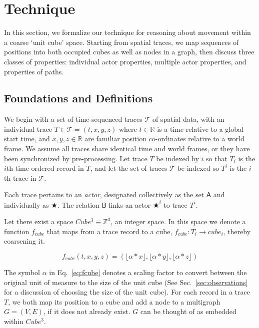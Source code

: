\section{Technique}
\label{sec:technique}

In this section, we formalize our technique for reasoning about movement within a coarse `unit cube' space.
Starting from spatial traces, we map sequences of positions into both occupied cubes as well as nodes in a graph, then discuss three classes of properties: individual actor properties, multiple actor properties, and properties of paths.

\subsection{Foundations and Definitions}
We begin with a set of time-sequenced traces $\mathcal{T}$ of spatial data, with an individual trace $T\in\mathcal{T} = (t,x,y,z)$ where $t\in\mathbb{R}$ is a time relative to a global start time, and $x,y,z\in \mathbb{R}$ are familiar position co-ordinates relative to a world frame. 
We assume all traces share identical time and world frames, or they have been synchronized by pre-processing.
Let trace $T$ be indexed by $i$ so that $T_i$ is the $i$th time-ordered record in $T$, and let the set of traces $\mathcal{T}$ be indexed so $T^i$ is the $i$th trace in $\mathcal{T}$. 

Each trace pertains to an \emph{actor}, designated collectively as the set $\mathsf{A}$ and individually as $\bigstar$. 
The relation $\mathsf{B}$ links an actor $\bigstar^i$ to trace $T^i$.


Let there exist a space $Cube^3 \equiv \mathbb{Z}^3$, an integer space.
In this space we denote a function $f_{cube}$ that maps from a trace record to a cube, $f_{cube} : T_i \rightarrow cube_i$, thereby coarsening it.


\begin{equation}
f_{cube}(t,x,y,z) = (\lfloor \alpha * x \rfloor, \lfloor \alpha * y \rfloor , \lfloor \alpha * z \rfloor )
\label{eq:fcube}
\end{equation}

The symbol $\alpha$ in Eq.~\ref{eq:fcube} denotes a scaling factor to convert between the original unit of measure to the size of the unit cube (See Sec.~\ref{sec:observations} for a discussion of choosing the size of the unit cube).
For each record in a trace $T$, we both map its position to a cube and add a node to a multigraph $G = (V,E)$, if it does not already exist. $G$ can be thought of as embedded within $Cube^3$.

